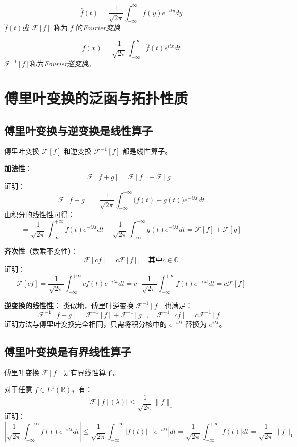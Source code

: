 \documentclass[12pt,a4paper]{article}
\theoremstyle{plain}
\theoremstyle{definition}
\theoremstyle{remark}
\begin{document}
	\[
	\hat{f}(t) = \frac{1}{\sqrt{2\pi}} \int_{-\infty}^{\infty} f(y) e^{-i t y} dy
	\]
	\(\hat{f}(t)\)或 $\mathcal{F}[f]$ 称为 \( f \) 的\emph{Fourier变换}
	
	
	\[
	f(x) = \frac{1}{\sqrt{2\pi}} \int_{-\infty}^{\infty} \hat{f}(t) e^{i t x} dt
	\]
	$\mathcal{F}^{-1}[f]$称为\emph{Fourier逆变换}。
	
	\section{傅里叶变换的泛函与拓扑性质}
	
	\subsection{傅里叶变换与逆变换是线性算子}
	
	傅里叶变换 $\mathcal{F}[f]$ 和逆变换 $\mathcal{F}^{-1}[f]$ 都是线性算子。
	
	\textbf{加法性}：
	\[
	\mathcal{F}[f+g] = \mathcal{F}[f] + \mathcal{F}[g]
	\]
	证明：
	\[
	\mathcal{F}[f+g] = \frac{1}{\sqrt{2\pi}} \int_{-\infty}^{+\infty} \big(f(t) + g(t)\big) e^{-i\lambda t} dt
	\]
	由积分的线性性可得：
	\[
	= \frac{1}{\sqrt{2\pi}} \int_{-\infty}^{+\infty} f(t) e^{-i\lambda t} dt + \frac{1}{\sqrt{2\pi}} \int_{-\infty}^{+\infty} g(t) e^{-i\lambda t} dt = \mathcal{F}[f] + \mathcal{F}[g]
	\]
	
	\textbf{齐次性}（数乘不变性）：
	\[
	\mathcal{F}[cf] = c\mathcal{F}[f], \quad \text{其中} c \in \mathbb{C}
	\]
	证明：
	\[
	\mathcal{F}[cf] = \frac{1}{\sqrt{2\pi}} \int_{-\infty}^{+\infty} cf(t) e^{-i\lambda t} dt = c \cdot \frac{1}{\sqrt{2\pi}} \int_{-\infty}^{+\infty} f(t) e^{-i\lambda t} dt = c\mathcal{F}[f]
	\]
	
	\textbf{逆变换的线性性}：
	类似地，傅里叶逆变换 $\mathcal{F}^{-1}[f]$ 也满足：
	\[
	\mathcal{F}^{-1}[f+g] = \mathcal{F}^{-1}[f] + \mathcal{F}^{-1}[g], \quad \mathcal{F}^{-1}[cf] = c\mathcal{F}^{-1}[f]
	\]
	证明方法与傅里叶变换完全相同，只需将积分核中的 $e^{-i\lambda t}$ 替换为 $e^{i\lambda t}$。
	
	
	\subsection{傅里叶变换是有界线性算子}
	
	傅里叶变换 $\mathcal{F}[f]$ 是有界线性算子。
	
	对于任意 $f \in L^1(\mathbb{R})$，有：
	\[
	|\mathcal{F}[f](\lambda)| \leq \frac{1}{\sqrt{2\pi}} \|f\|_1
	\]
	证明：
	\[
	\left| \frac{1}{\sqrt{2\pi}} \int_{-\infty}^{+\infty} f(t) e^{-i\lambda t} dt \right|\leq \frac{1}{\sqrt{2\pi}} \int_{-\infty}^{+\infty} |f(t)|\cdot|e^{-i\lambda t}| dt = \frac{1}{\sqrt{2\pi}} \int_{-\infty}^{+\infty} |f(t)| dt = \frac{1}{\sqrt{2\pi}} \|f\|_1
	\]
	
\end{document}
